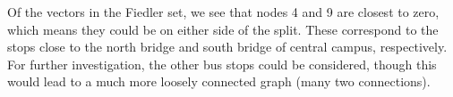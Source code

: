 \documentclass[letterpaper,12pt]{article}
\begin{document}
\noindent Of the vectors in the Fiedler set, we see that nodes 4 and 9 are closest to zero, which means they could be on either side of the split. These correspond to the stops close to the north bridge and south bridge of central campus, respectively. For further investigation, the other bus stops could be considered, though this would lead to a much more loosely connected graph (many two connections).
\end{document}
